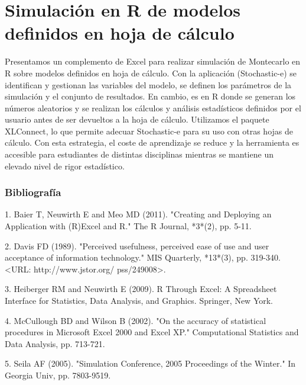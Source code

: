 \chapter{Simulación en R de modelos definidos en hoja de cálculo}




Presentamos un complemento de Excel para realizar simulación de Montecarlo en R sobre modelos definidos en hoja de cálculo. Con la aplicación (Stochastic-e) se identifican y gestionan las variables del modelo, se definen los parámetros de la simulación y el conjunto de resultados. En cambio, es en R donde se generan los números aleatorios y se realizan los cálculos y análisis estadísticos definidos por el usuario antes de ser devueltos a la hoja de cálculo. Utilizamos el paquete
XLConnect, lo que permite adecuar Stochastic-e para su uso con otras hojas de cálculo. Con esta estrategia, el coste de aprendizaje se reduce y la herramienta es accesible para estudiantes de distintas disciplinas mientras se mantiene un
elevado nivel de rigor estadístico. \bigskip\subsection*{Bibliografía}

 1. Baier T, Neuwirth E and Meo MD (2011). "Creating and Deploying an Application with (R)Excel and R." The R Journal, *3*(2), pp. 5-11.

2. Davis FD (1989). "Perceived usefulness, perceived ease of use and user acceptance of information technology." MIS Quarterly, *13*(3), pp. 319-340. <URL: http://www.jstor.org/ pss/249008>.

3. Heiberger RM and Neuwirth E (2009). R Through Excel: A Spreadsheet Interface for Statistics, Data Analysis, and Graphics. Springer, New York.

4. McCullough BD and Wilson B (2002). "On the accuracy of statistical procedures in Microsoft Excel 2000 and Excel XP." Computational Statistics and Data Analysis, pp. 713-721.

5. Seila AF (2005). "Simulation Conference, 2005 Proceedings of the Winter." In Georgia Univ, pp. 7803-9519.



%

%
